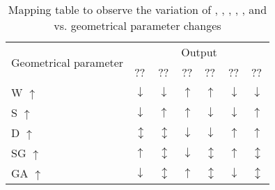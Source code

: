 \documentclass[journal]{IEEEtran}
\begin{document}
\begin{table}
\caption{Mapping table to observe the variation of , , , , , and vs. geometrical parameter changes}
\label{table:mapping} %
\begin{tabular}{ |p{3.2cm}||p{.37cm}|p{.37cm}|p{.37cm}|p{.37cm}|p{.37cm}|p{.37cm}| }
 \hline
 \multirow{2}{*}{Geometrical parameter} & \multicolumn{6}{|c|}{Output} \\  \cline{2-7}
  & ?? & ?? & ?? & ?? & ?? & ?? \\ %
 \hline
  W $\uparrow$ & $\downarrow$  & $\downarrow$ & $\uparrow$ & $\uparrow$ & $\downarrow$ & $\downarrow$ \\
 \hline
  S $\uparrow$ & $\downarrow$ & $\uparrow$ & $\uparrow$ & $\downarrow$ & $\downarrow$ & $\uparrow$ \\
  \hline
  D $\uparrow$ & $\updownarrow$ & $\updownarrow$ & $\downarrow$ & $\downarrow$ & $\uparrow$ & $\uparrow$\\
 \hline
  SG $\uparrow$ & $\uparrow$ & $\updownarrow$ & $\downarrow$ & $\updownarrow$ & $\uparrow$ & $\updownarrow$\\
 \hline
  GA $\uparrow$ & $\downarrow$  & $\updownarrow$ & $\uparrow$ & $\updownarrow$ & $\downarrow$ & $\updownarrow$\\
 \hline
\end{tabular}
\end{table}
\end{document}
